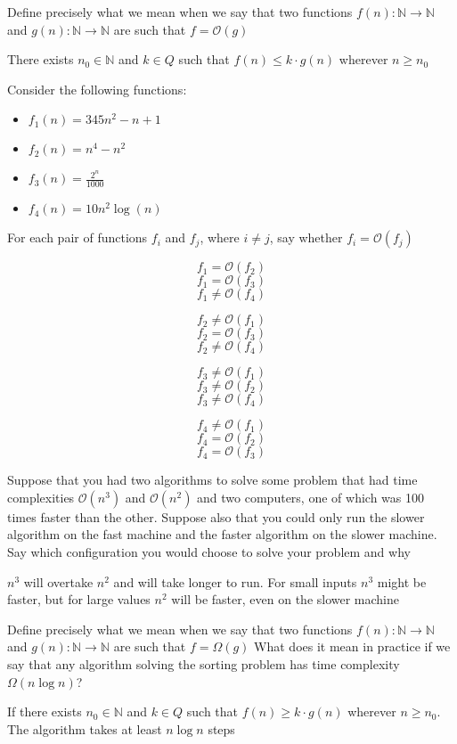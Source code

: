 \documentclass[addpoints]{exam}
\begin{document}
\begin{questions}
\question[2]Define precisely what we mean when we say that two functions $f(n):\mathbb{N}\rightarrow\mathbb{N}$ and $g(n):\mathbb{N}\rightarrow\mathbb{N}$ are such that $f=\mathcal{O}(g)$
\begin{solution}[2in]
	There exists $n_0\in \mathbb{N}$ and $k\in Q$ such that $f(n)\leqslant k\cdot g(n)$ wherever $n\geqslant n_0$
\end{solution}

\question[6]Consider the following functions:
\begin{itemize}
	\item $f_1(n)=345n^2-n+1$
	\item $f_2(n)=n^4-n^2$
	\item $f_3(n)=\frac{2^n}{1000}$
	\item $f_4(n)=10n^2\log(n)$
\end{itemize}
For each pair of functions $f_i$ and $f_j$, where $i\neq j$, say whether $f_i=\mathcal{O}(f_j)$
\begin{solution}[2in]
	$$f_1=\mathcal{O}(f_2)$$
	$$f_1=\mathcal{O}(f_3)$$
	$$f_1\neq \mathcal{O}(f_4)$$
	
	$$f_2\neq \mathcal{O}(f_1)$$
	$$f_2=\mathcal{O}(f_3)$$
	$$f_2\neq\mathcal{O}(f_4)$$
	
	$$f_3\neq\mathcal{O}(f_1)$$
	$$f_3\neq\mathcal{O}(f_2)$$
	$$f_3\neq\mathcal{O}(f_4)$$
	
	$$f_4\neq\mathcal{O}(f_1)$$
	$$f_4=\mathcal{O}(f_2)$$
	$$f_4=\mathcal{O}(f_3)$$
	
\end{solution}


\question[4]Suppose that you had two algorithms to solve some problem that had
time complexities $\mathcal{O}(n^3)$ and $\mathcal{O}(n^2)$ and two computers, one of which
was 100 times faster than the other. Suppose also that you could only
run the slower algorithm on the fast machine and the faster algorithm
on the slower machine. Say which configuration you would choose to
solve your problem and why
\begin{solution}[2in]
	$n^3$ will overtake $n^2$ and will take longer to run. For small inputs $n^3$ might be faster, but for large values $n^2$ will be faster, even on the slower machine
\end{solution}

\question[4]
Define precisely what we mean when we say that two functions $f(n):\mathbb{N}\rightarrow\mathbb{N}$ and $g(n):\mathbb{N}\rightarrow\mathbb{N}$ are such that $f=\Omega(g)$ What does it mean in practice if we say that any algorithm solving the sorting problem has time complexity $\Omega(n\log n)$?
\begin{solution}[2in]
	If there exists $n_0\in \mathbb{N}$ and $k\in Q$ such that $f(n)\geqslant k\cdot g(n)$ wherever $n\geqslant n_0$. The algorithm takes at least $n\log n$ steps
\end{solution}


\end{questions}
\end{document}
